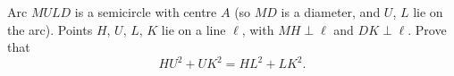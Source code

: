 Arc $MULD$ is a semicircle with centre $A$ (so $MD$ is a diameter, and $U$, $L$ lie on the arc). Points $H$, $U$, $L$, $K$ lie on a line $\ell$, with $MH\perp\ell$ and $DK\perp\ell$. Prove that
\[
HU^2+UK^2=HL^2+LK^2 .
\]

